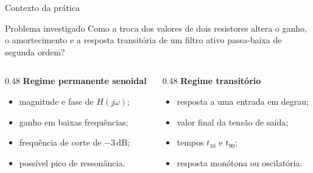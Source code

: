 \begin{frame}{Contexto da prática}
  \begin{block}{Problema investigado}
    Como a troca dos valores de dois resistores altera o ganho, o amortecimento e
    a resposta transitória de um filtro ativo passa-baixa de segunda ordem?
  \end{block}

  \begin{columns}[T,onlytextwidth]
    \begin{column}{0.48\textwidth}
      \textbf{Regime permanente senoidal}
      \begin{itemize}
        \item magnitude e fase de $H(j\omega)$;
        \item ganho em baixas frequências;
        \item frequência de corte de $-3\,\mathrm{dB}$;
        \item possível pico de ressonância.
      \end{itemize}
    \end{column}
    \begin{column}{0.48\textwidth}
      \textbf{Regime transitório}
      \begin{itemize}
        \item resposta a uma entrada em degrau;
        \item valor final da tensão de saída;
        \item tempos $t_{10}$ e $t_{90}$;
        \item resposta monótona ou oscilatória.
      \end{itemize}
    \end{column}
  \end{columns}
\end{frame}
